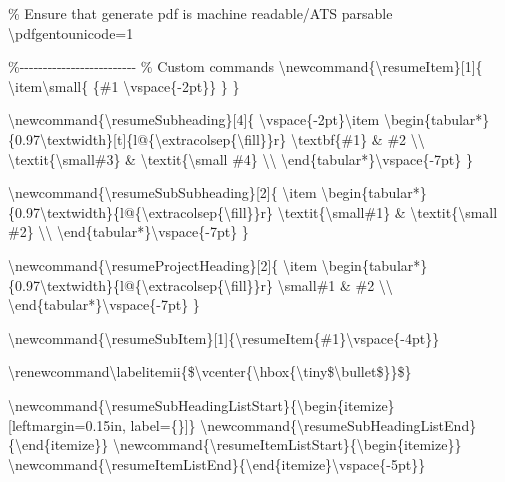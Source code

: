\% Ensure that generate pdf is machine readable/ATS parsable
\textbackslash pdfgentounicode=1

\%-\/-\/-\/-\/-\/-\/-\/-\/-\/-\/-\/-\/-\/-\/-\/-\/-\/-\/-\/-\/-\/-\/-\/-\/-
\% Custom commands
\textbackslash newcommand\{\textbackslash resumeItem\}{[}1{]}\{
\textbackslash item\textbackslash small\{ \{\#1
\textbackslash vspace\{-2pt\}\} \} \}

\textbackslash newcommand\{\textbackslash resumeSubheading\}{[}4{]}\{
\textbackslash vspace\{-2pt\}\textbackslash item
\textbackslash begin\{tabular*\}\{0.97\textbackslash textwidth\}{[}t{]}\{l@\{\textbackslash extracolsep\{\textbackslash fill\}\}r\}
\textbackslash textbf\{\#1\} \& \#2 \textbackslash\textbackslash{}
\textbackslash textit\{\textbackslash small\#3\} \&
\textbackslash textit\{\textbackslash small \#4\}
\textbackslash\textbackslash{}
\textbackslash end\{tabular*\}\textbackslash vspace\{-7pt\} \}

\textbackslash newcommand\{\textbackslash resumeSubSubheading\}{[}2{]}\{
\textbackslash item
\textbackslash begin\{tabular*\}\{0.97\textbackslash textwidth\}\{l@\{\textbackslash extracolsep\{\textbackslash fill\}\}r\}
\textbackslash textit\{\textbackslash small\#1\} \&
\textbackslash textit\{\textbackslash small \#2\}
\textbackslash\textbackslash{}
\textbackslash end\{tabular*\}\textbackslash vspace\{-7pt\} \}

\textbackslash newcommand\{\textbackslash resumeProjectHeading\}{[}2{]}\{
\textbackslash item
\textbackslash begin\{tabular*\}\{0.97\textbackslash textwidth\}\{l@\{\textbackslash extracolsep\{\textbackslash fill\}\}r\}
\textbackslash small\#1 \& \#2 \textbackslash\textbackslash{}
\textbackslash end\{tabular*\}\textbackslash vspace\{-7pt\} \}

\textbackslash newcommand\{\textbackslash resumeSubItem\}{[}1{]}\{\textbackslash resumeItem\{\#1\}\textbackslash vspace\{-4pt\}\}

\textbackslash renewcommand\textbackslash labelitemii\{\$\textbackslash vcenter\{\textbackslash hbox\{\textbackslash tiny\$\textbackslash bullet\$\}\}\$\}

\textbackslash newcommand\{\textbackslash resumeSubHeadingListStart\}\{\textbackslash begin\{itemize\}{[}leftmargin=0.15in,
label=\{\}{]}\}
\textbackslash newcommand\{\textbackslash resumeSubHeadingListEnd\}\{\textbackslash end\{itemize\}\}
\textbackslash newcommand\{\textbackslash resumeItemListStart\}\{\textbackslash begin\{itemize\}\}
\textbackslash newcommand\{\textbackslash resumeItemListEnd\}\{\textbackslash end\{itemize\}\textbackslash vspace\{-5pt\}\}

